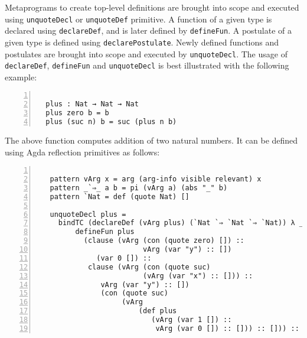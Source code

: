 \documentclass[sigplan,10pt]{acmart}
\begin{document}
Metaprograms to create top-level definitions are brought into scope and executed using {\tt unquoteDecl} or {\tt unquoteDef} primitive. A function of a given type is declared using {\tt declareDef}, and is later defined by {\tt defineFun}. A postulate of a given type is defined using {\tt declarePostulate}. Newly defined functions and postulates are brought into scope and executed by {\tt unquoteDecl}. The usage of {\tt declareDef}, {\tt defineFun} and {\tt unquoteDecl} is best illustrated with the following example:

\begin{center}
\begingroup
\fontsize{7pt}{9pt}\selectfont
\begin{Verbatim}[frame = lines, rulecolor=\color{blue}, numbers = left, numbersep = 0pt]

  plus : Nat → Nat → Nat
  plus zero b = b
  plus (suc n) b = suc (plus n b)

\end{Verbatim}
\endgroup
\end{center}

\normalsize

The above function computes addition of two natural numbers. It can be defined using Agda reflection primitives as follows: 

\begin{center}
\begingroup
\fontsize{7pt}{9pt}\selectfont
\begin{Verbatim}[frame = lines, rulecolor=\color{blue}, numbers = left, numbersep = 0pt]

   pattern vArg x = arg (arg-info visible relevant) x
   pattern _`⇒_ a b = pi (vArg a) (abs "_" b)
   pattern `Nat = def (quote Nat) []

   unquoteDecl plus =
     bindTC (declareDef (vArg plus) (`Nat `⇒ `Nat `⇒ `Nat)) λ _ → 
         defineFun plus
           (clause (vArg (con (quote zero) []) ::
                         vArg (var "y") :: [])
              (var 0 []) ::
            clause (vArg (con (quote suc)
                         (vArg (var "x") :: [])) ::
               vArg (var "y") :: [])
               (con (quote suc)
                    (vArg
                        (def plus
                           (vArg (var 1 []) ::
                            vArg (var 0 []) :: [])) :: [])) :: [])

\end{Verbatim}
\endgroup
\end{center}

\normalsize
\end{document}
